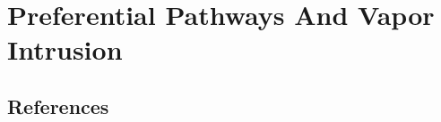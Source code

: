 \documentclass[../thesis.tex]{subfiles}
\begin{document}
\chapter{Preferential Pathways And Vapor Intrusion}

\section{References}

\begin{comment}

Main point of this chapter:

Demonstrate how and why subsurface preferential pathways can have such a significant effect on VI.

Outline:

Introduction:
* How did we come to find out about PP?
* Why should we care about them?
* How do they work?

Methods:
* How do we model the PP?

Results & Discussion:

* Show how the model predicts the VI at the ASU house. (Main case)
* Turn on and off the enhanced advective potential and contaminant availability to show their contributions.
* Some other factors that affect PP "performance" in the main case. I.e. effect of gravel sub-base.


Conclusion:
* PPs need to enhance advective transport and introduce extra contaminants to be impactful (plus other factors). How common place these combination of factors are determine the concern for PPs.
* Suggestions for how to deal/uncover PPs? Follow Danish recommendations. See if subsurface piping may be discovered a priori. Sample nearby manholes (likely to play some role). Might even use CPM.

\end{comment}
\end{document}
